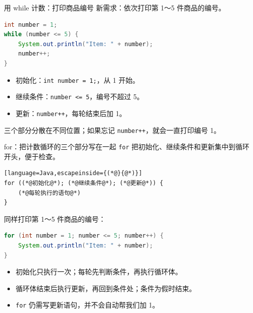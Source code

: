 \documentclass[aspectratio=169]{beamer}
\begin{document}
\begin{frame}[fragile]{用 while 计数：打印商品编号}
  新需求：依次打印第 1～5 件商品的编号。
  \begin{lstlisting}[language=Java]
int number = 1;
while (number <= 5) {
    System.out.println("Item: " + number);
    number++;
}
  \end{lstlisting}
  \begin{itemize}
    \item 初始化：\texttt{int number = 1;}，从 1 开始。
    \item 继续条件：\texttt{number <= 5}，编号不超过 5。
    \item 更新：\texttt{number++}，每轮结束后加 1。
  \end{itemize}
  \medskip
  三个部分分散在不同位置；如果忘记 \texttt{number++}，就会一直打印编号 1。
\end{frame}

\begin{frame}[fragile]{for：把计数循环的三个部分写在一起}
  \texttt{for} 把初始化、继续条件和更新集中到循环开头，便于检查。
  \begin{lstlisting}[language=Java,escapeinside={(*@}{@*)}]
for ((*@初始化@*); (*@继续条件@*); (*@更新@*)) {
    (*@每轮执行的语句@*)
}
  \end{lstlisting}
  同样打印第 1～5 件商品的编号：
  \begin{lstlisting}[language=Java]
for (int number = 1; number <= 5; number++) {
    System.out.println("Item: " + number);
}
  \end{lstlisting}
  \begin{itemize}
    \item 初始化只执行一次；每轮先判断条件，再执行循环体。
    \item 循环体结束后执行更新，再回到条件处；条件为假时结束。
    \item \texttt{for} 仍需写更新语句，并不会自动帮我们加 1。
  \end{itemize}
\end{frame}

\end{document}
